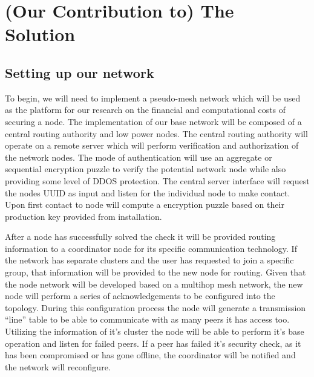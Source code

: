 \documentclass[a4paper,titlepage]{article}
\begin{document}
\section{(Our Contribution to) The Solution}

\subsection{Setting up our network}
To begin, we will need to implement a pseudo-mesh network which will be used as the platform for our research on the financial and computational costs of securing a node. The implementation of our base network will be composed of a central routing authority and low power nodes. The central routing authority will operate on a remote server which will perform verification and authorization of the network nodes. The mode of authentication will use an aggregate or sequential encryption puzzle to verify the potential network node while also providing some level of DDOS protection. The central server interface will request the nodes UUID as input and listen for the individual node to make contact. Upon first contact to node will compute a encryption puzzle based on their production key provided from installation.

After a node has successfully solved the check it will be provided routing information to a coordinator node for its specific communication technology. If the network has separate clusters and the user has requested to join a specific group, that information will be provided to the new node for routing. Given that the node network will be developed based on a multihop mesh network, the new node will perform a series of acknowledgements to be configured into the topology. During this configuration process the node will generate a transmission “line” table to be able to communicate with as many peers it has access too. Utilizing the information of it’s cluster the node will be able to perform it’s base operation and listen for failed peers. If a peer has failed it’s security check, as it has been compromised or has gone offline, the coordinator will be notified and the network will reconfigure.
\end{document}
